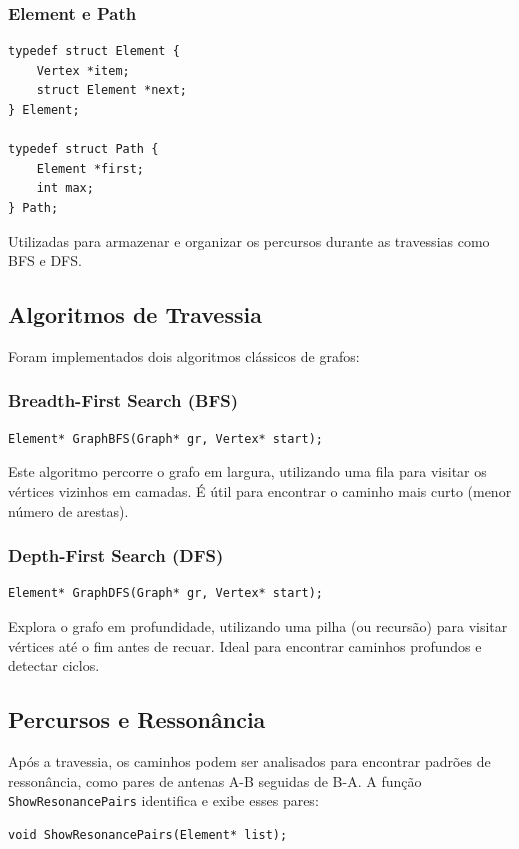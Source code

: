 \documentclass[a4paper,12pt]{article}
\begin{document}
\subsubsection{Element e Path}
\begin{lstlisting}[style=CStyle]
typedef struct Element {
    Vertex *item;
    struct Element *next;
} Element;

typedef struct Path {
    Element *first;
    int max;
} Path;
\end{lstlisting}
Utilizadas para armazenar e organizar os percursos durante as travessias como BFS e DFS.

\subsection{Algoritmos de Travessia}
Foram implementados dois algoritmos clássicos de grafos:

\subsubsection{Breadth-First Search (BFS)}
\begin{lstlisting}[style=CStyle]
Element* GraphBFS(Graph* gr, Vertex* start);
\end{lstlisting}
Este algoritmo percorre o grafo em largura, utilizando uma fila para visitar os vértices vizinhos em camadas. É útil para encontrar o caminho mais curto (menor número de arestas).

\subsubsection{Depth-First Search (DFS)}
\begin{lstlisting}[style=CStyle]
Element* GraphDFS(Graph* gr, Vertex* start);
\end{lstlisting}
Explora o grafo em profundidade, utilizando uma pilha (ou recursão) para visitar vértices até o fim antes de recuar. Ideal para encontrar caminhos profundos e detectar ciclos.

\subsection{Percursos e Ressonância}
Após a travessia, os caminhos podem ser analisados para encontrar padrões de ressonância, como pares de antenas A-B seguidas de B-A. A função \texttt{ShowResonancePairs} identifica e exibe esses pares:

\begin{lstlisting}[style=CStyle]
void ShowResonancePairs(Element* list);
\end{lstlisting}
\end{document}
